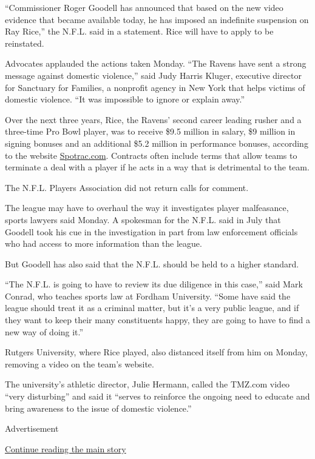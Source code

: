 ``Commissioner Roger Goodell has announced that based on the new video
evidence that became available today, he has imposed an indefinite
suspension on Ray Rice,'' the N.F.L. said in a statement. Rice will have
to apply to be reinstated.

Advocates applauded the actions taken Monday. ``The Ravens have sent a
strong message against domestic violence,'' said Judy Harris Kluger,
executive director for Sanctuary for Families, a nonprofit agency in New
York that helps victims of domestic violence. ``It was impossible to
ignore or explain away.''

Over the next three years, Rice, the Ravens' second career leading
rusher and a three-time Pro Bowl player, was to receive \$9.5 million in
salary, \$9 million in signing bonuses and an additional \$5.2 million
in performance bonuses, according to the website
\href{http://www.spotrac.com/nfl/baltimore-ravens/ray-rice/}{Spotrac.com}.
Contracts often include terms that allow teams to terminate a deal with
a player if he acts in a way that is detrimental to the team.

The N.F.L. Players Association did not return calls for comment.

The league may have to overhaul the way it investigates player
malfeasance, sports lawyers said Monday. A spokesman for the N.F.L. said
in July that Goodell took his cue in the investigation in part from law
enforcement officials who had access to more information than the
league.

But Goodell has also said that the N.F.L. should be held to a higher
standard.

``The N.F.L. is going to have to review its due diligence in this
case,'' said Mark Conrad, who teaches sports law at Fordham University.
``Some have said the league should treat it as a criminal matter, but
it's a very public league, and if they want to keep their many
constituents happy, they are going to have to find a new way of doing
it.''

Rutgers University, where Rice played, also distanced itself from him on
Monday, removing a video on the team's website.

The university's athletic director, Julie Hermann, called the TMZ.com
video ``very disturbing'' and said it ``serves to reinforce the ongoing
need to educate and bring awareness to the issue of domestic violence.''

Advertisement

\protect\hyperlink{after-bottom}{Continue reading the main story}

